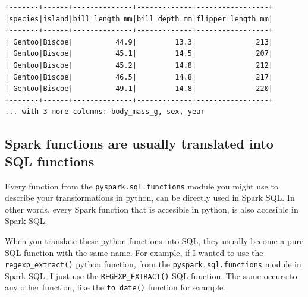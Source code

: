 \documentclass[
  11pt,
  letterpaper,
  DIV=11,
  numbers=noendperiod]{scrreprt}
\begin{document}
\begin{verbatim}
+-------+------+--------------+-------------+-----------------+
|species|island|bill_length_mm|bill_depth_mm|flipper_length_mm|
+-------+------+--------------+-------------+-----------------+
| Gentoo|Biscoe|          44.9|         13.3|              213|
| Gentoo|Biscoe|          45.1|         14.5|              207|
| Gentoo|Biscoe|          45.2|         14.8|              212|
| Gentoo|Biscoe|          46.5|         14.8|              217|
| Gentoo|Biscoe|          49.1|         14.8|              220|
+-------+------+--------------+-------------+-----------------+
... with 3 more columns: body_mass_g, sex, year
\end{verbatim}

\subsection{Spark functions are usually translated into SQL
functions}\label{sec-sql-expr}

Every function from the \texttt{pyspark.sql.functions} module you might
use to describe your transformations in python, can be directly used in
Spark SQL. In other words, every Spark function that is accesible in
python, is also accesible in Spark SQL.

When you translate these python functions into SQL, they usually become
a pure SQL function with the same name. For example, if I wanted to use
the \texttt{regexp\_extract()} python function, from the
\texttt{pyspark.sql.functions} module in Spark SQL, I just use the
\texttt{REGEXP\_EXTRACT()} SQL function. The same occurs to any other
function, like the \texttt{to\_date()} function for example.
\end{document}
